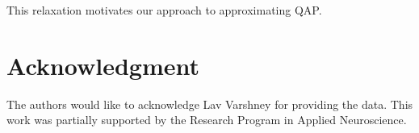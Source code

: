 \documentclass[preprint,11pt]{elsarticle}
\begin{document}
This relaxation motivates our approach to approximating QAP.

	



\section*{Acknowledgment}
% 
The authors would like to acknowledge 
Lav Varshney for providing the data. This work was partially supported by the Research Program in Applied Neuroscience. 
% 
% 


\end{document}
